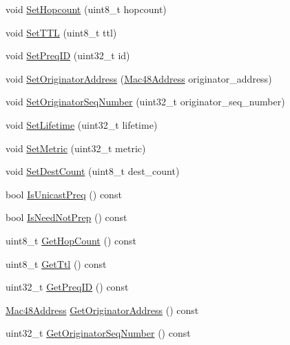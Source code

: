 \begin{DoxyCompactItemize}
void \hyperlink{classns3_1_1dot11s_1_1IePreq_a0e0eae19a84a2ac150f83c8e03313b64}{Set\+Hopcount} (uint8\+\_\+t hopcount)
\item 
void \hyperlink{classns3_1_1dot11s_1_1IePreq_a6a79b71873e0453e65656311c4865557}{Set\+T\+TL} (uint8\+\_\+t ttl)
\item 
void \hyperlink{classns3_1_1dot11s_1_1IePreq_ac6fdcd7161eee09da2d33d2beef9ecdc}{Set\+Preq\+ID} (uint32\+\_\+t id)
\item 
void \hyperlink{classns3_1_1dot11s_1_1IePreq_a71abbc0f4c57979fd2fa9ee617efa62d}{Set\+Originator\+Address} (\hyperlink{classns3_1_1Mac48Address}{Mac48\+Address} originator\+\_\+address)
\item 
void \hyperlink{classns3_1_1dot11s_1_1IePreq_a5fd08398f52a810ca473028a464a15ab}{Set\+Originator\+Seq\+Number} (uint32\+\_\+t originator\+\_\+seq\+\_\+number)
\item 
void \hyperlink{classns3_1_1dot11s_1_1IePreq_af6c579838e0f4c77fe6ce714e3089253}{Set\+Lifetime} (uint32\+\_\+t lifetime)
\item 
void \hyperlink{classns3_1_1dot11s_1_1IePreq_a9e123e4e8cf656ed41368ca9d6307694}{Set\+Metric} (uint32\+\_\+t metric)
\item 
void \hyperlink{classns3_1_1dot11s_1_1IePreq_a9dfe6b1990a1b5584beb231e28b84627}{Set\+Dest\+Count} (uint8\+\_\+t dest\+\_\+count)
\item 
bool \hyperlink{classns3_1_1dot11s_1_1IePreq_a3c8b4cdd0321b535c1fb85fce51b21fa}{Is\+Unicast\+Preq} () const 
\item 
bool \hyperlink{classns3_1_1dot11s_1_1IePreq_a2dabf717c16060136e3b62925fa6cfe4}{Is\+Need\+Not\+Prep} () const 
\item 
uint8\+\_\+t \hyperlink{classns3_1_1dot11s_1_1IePreq_aa6166e35bfa7322a607d034c0d7d4736}{Get\+Hop\+Count} () const 
\item 
uint8\+\_\+t \hyperlink{classns3_1_1dot11s_1_1IePreq_a9cad4b4d94bfef9e145ae1f0fc46a1e8}{Get\+Ttl} () const 
\item 
uint32\+\_\+t \hyperlink{classns3_1_1dot11s_1_1IePreq_af563125aeced80ac9ecf000ce3e898cd}{Get\+Preq\+ID} () const 
\item 
\hyperlink{classns3_1_1Mac48Address}{Mac48\+Address} \hyperlink{classns3_1_1dot11s_1_1IePreq_a79555e72581c99d27c38d4edfd2a82d1}{Get\+Originator\+Address} () const 
\item 
uint32\+\_\+t \hyperlink{classns3_1_1dot11s_1_1IePreq_a6e2d0756262e7d7044fd1e76289a7ce8}{Get\+Originator\+Seq\+Number} () const 
\item 

\end{DoxyCompactItemize}
